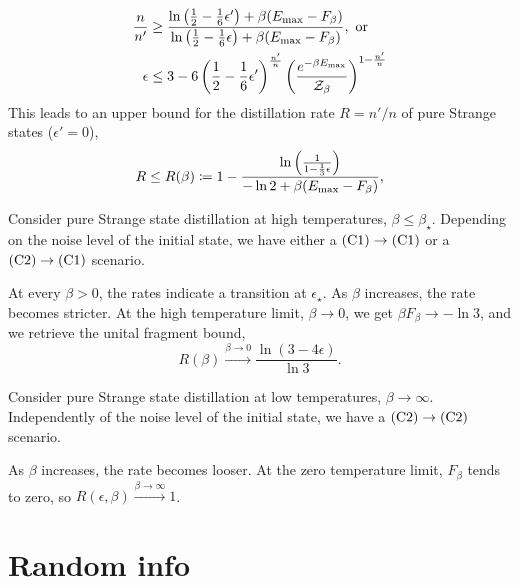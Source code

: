\documentclass[pra,
aps,
twocolumn,
superscriptaddress,
groupedaddress,
nofootinbib,
reprint
]{revtex4-1}
\begin{document}
\begin{enumerate}
\begin{align}
	\frac{n}{n'} &\geq \frac{\ln{\big( \frac{1}{2}-\frac{1}{6}\epsilon' \big)} + \beta (E_{\rm{max}} - F_\beta)}{\ln{\big( \frac{1}{2}-\frac{1}{6}\epsilon \big)} + \beta (E_{\rm{max}} - F_\beta)}, \text{ or} \\
	\epsilon &\leq 3 - 6 \left( \frac{1}{2} - \frac{1}{6}\epsilon' \right)^{\frac{n'}{n}} \left( \frac{e^{-\beta E_{\rm{max}}}}{\mathcal{Z}_\beta} \right)^{1 - \frac{n'}{n}}	
\end{align}
This leads to an upper bound for the distillation rate $R=n'/n$ of pure Strange states ($\epsilon' = 0$),
\begin{equation}
	R \leq R(\beta) \coloneqq 1 - \frac{\ln{\left(\frac{1}{1-\frac{1}{3}\epsilon} \right)}}{-\ln{2} + \beta (E_{\rm{max}} - F_\beta)},
\end{equation}
\end{enumerate}

Consider pure Strange state distillation at high temperatures, $\beta \leq \beta_{\star}$.
Depending on the noise level of the initial state, we have either a $\rm{(C1)} \rightarrow \rm{(C1)}$ or a $\rm{(C2)} \rightarrow \rm{(C1)}$ scenario.

At every $\beta > 0$, the rates indicate a transition at $\epsilon_{\star}$.
As $\beta$ increases, the rate becomes stricter.
At the high temperature limit, $\beta \rightarrow 0$, we get $\beta F_\beta \rightarrow -\ln{3}$, and we retrieve the unital fragment bound,
\begin{equation}
	R(\beta) \xrightarrow{\beta \rightarrow 0} \frac{\ln{(3-4\epsilon)}}{\ln{3}}.
\end{equation}

Consider pure Strange state distillation at low temperatures, $\beta \rightarrow \infty$.
Independently of the noise level of the initial state, we have a $\rm{(C2)} \rightarrow \rm{(C2)}$ scenario.

As $\beta$ increases, the rate becomes looser.
At the zero temperature limit, $F_\beta$ tends to zero, so $R(\epsilon, \beta) \xrightarrow{\beta \rightarrow \infty} 1$.



\null\newpage

\section{Random info}

\vspace{-10pt}
\end{document}
